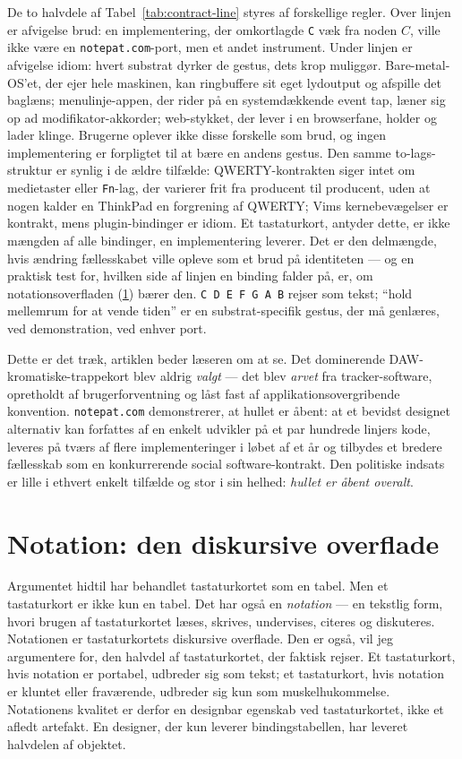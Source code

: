 \documentclass[10pt,letterpaper,twocolumn]{article}
\begin{document}
De to halvdele af Tabel~\ref{tab:contract-line} styres af forskellige regler. Over linjen er afvigelse brud: en implementering, der omkortlagde \texttt{C} væk fra noden $C$, ville ikke være en \texttt{notepat.com}-port, men et andet instrument. Under linjen er afvigelse idiom: hvert substrat dyrker de gestus, dets krop muliggør. Bare-metal-OS'et, der ejer hele maskinen, kan ringbuffere sit eget lydoutput og afspille det baglæns; menulinje-appen, der rider på en systemdækkende event tap, læner sig op ad modifikator-akkorder; web-stykket, der lever i en browserfane, holder og lader klinge. Brugerne oplever ikke disse forskelle som brud, og ingen implementering er forpligtet til at bære en andens gestus. Den samme to-lags-struktur er synlig i de ældre tilfælde: QWERTY-kontrakten siger intet om medietaster eller \texttt{Fn}-lag, der varierer frit fra producent til producent, uden at nogen kalder en ThinkPad en forgrening af QWERTY; Vims kernebevægelser er kontrakt, mens plugin-bindinger er idiom. Et tastaturkort, antyder dette, er ikke mængden af alle bindinger, en implementering leverer. Det er den delmængde, hvis ændring fællesskabet ville opleve som et brud på identiteten --- og en praktisk test for, hvilken side af linjen en binding falder på, er, om notationsoverfladen (\textsection\ref{sec:notation}) bærer den. \texttt{C D E F G A B} rejser som tekst; ``hold mellemrum for at vende tiden'' er en substrat-specifik gestus, der må genlæres, ved demonstration, ved enhver port.

Dette er det træk, artiklen beder læseren om at se. Det dominerende DAW-kromatiske-trappekort blev aldrig \emph{valgt} --- det blev \emph{arvet} fra tracker-software, opretholdt af brugerforventning og låst fast af applikationsovergribende konvention. \texttt{notepat.com} demonstrerer, at hullet er åbent: at et bevidst designet alternativ kan forfattes af en enkelt udvikler på et par hundrede linjers kode, leveres på tværs af flere implementeringer i løbet af et år og tilbydes et bredere fællesskab som en konkurrerende social software-kontrakt. Den politiske indsats er lille i ethvert enkelt tilfælde og stor i sin helhed: \emph{hullet er åbent overalt}.

\section{Notation: den diskursive overflade}
\label{sec:notation}

Argumentet hidtil har behandlet tastaturkortet som en tabel. Men et tastaturkort er ikke kun en tabel. Det har også en \emph{notation} --- en tekstlig form, hvori brugen af tastaturkortet læses, skrives, undervises, citeres og diskuteres. Notationen er tastaturkortets diskursive overflade. Den er også, vil jeg argumentere for, den halvdel af tastaturkortet, der faktisk rejser. Et tastaturkort, hvis notation er portabel, udbreder sig som tekst; et tastaturkort, hvis notation er kluntet eller fraværende, udbreder sig kun som muskelhukommelse. Notationens kvalitet er derfor en designbar egenskab ved tastaturkortet, ikke et afledt artefakt. En designer, der kun leverer bindingstabellen, har leveret halvdelen af objektet.
\end{document}
